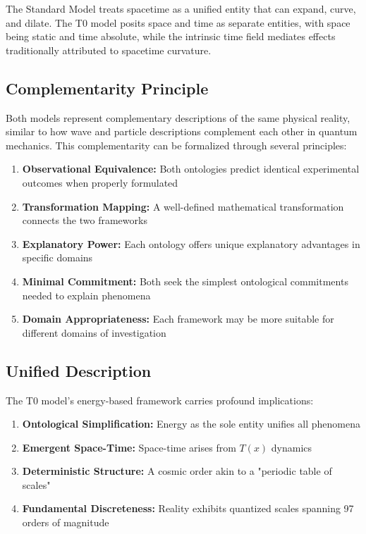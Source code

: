\documentclass[aps,prl,twocolumn,superscriptaddress,nofootinbib]{revtex4-2}
\newcommand{\Tfield}{T(x)}
\begin{document}
	The Standard Model treats spacetime as a unified entity that can expand, curve, and dilate. The T0 model posits space and time as separate entities, with space being static and time absolute, while the intrinsic time field mediates effects traditionally attributed to spacetime curvature.
	
	\subsection{Complementarity Principle}
	\label{subsec:complementarity}
	
	Both models represent complementary descriptions of the same physical reality, similar to how wave and particle descriptions complement each other in quantum mechanics. This complementarity can be formalized through several principles:
	
	\begin{enumerate}
		\item \textbf{Observational Equivalence:} Both ontologies predict identical experimental outcomes when properly formulated
		\item \textbf{Transformation Mapping:} A well-defined mathematical transformation connects the two frameworks
		\item \textbf{Explanatory Power:} Each ontology offers unique explanatory advantages in specific domains
		\item \textbf{Minimal Commitment:} Both seek the simplest ontological commitments needed to explain phenomena
		\item \textbf{Domain Appropriateness:} Each framework may be more suitable for different domains of investigation
	\end{enumerate}
	
	\subsection{Unified Description}
	\label{subsec:unified_description}
	
	The T0 model's energy-based framework carries profound implications:
	\begin{enumerate}
		\item \textbf{Ontological Simplification:} Energy as the sole entity unifies all phenomena
		\item \textbf{Emergent Space-Time:} Space-time arises from $\Tfield$ dynamics
		\item \textbf{Deterministic Structure:} A cosmic order akin to a "periodic table of scales"
		\item \textbf{Fundamental Discreteness:} Reality exhibits quantized scales spanning 97 orders of magnitude
	\end{enumerate}
	
\end{document}
